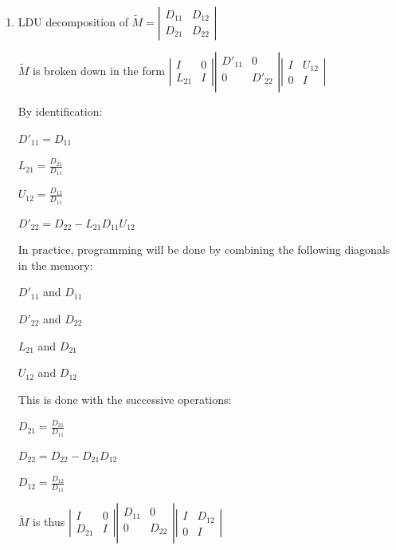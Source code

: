 \begin{enumerate}
  \item LDU decomposition of
$\tilde{M} =
\left|\begin{array}{cc}
  {D_{11} } & {D_{12} } \\
  {D_{21} } & {D_{22} }
\end{array}\right|$

$\widetilde{M}$ is broken down in the form
$\left|
\begin{array}{cc}
  I & 0 \\
  L_{21} & I
\end{array}
\right|
\left|
\begin{array}{cc}
  D'_{11} & 0 \\
  0 & D'_{22} \\
\end{array}
\right|
\left|
\begin{array}{cc}
  I & U_{12} \\
  0 & I
\end{array}
\right|
$

By identification:

$D'_{11} =  D_{11}$

$L_{21} = \frac{D_{21}}{D_{11}}$

$U_{12} = \frac{D_{12}}{D_{11}}$

$D'_{22} =  D_{22} - L_{21}D_{11}U_{12}$

In practice, programming will be done by combining the following diagonals in
the memory:

$D'_{11}$ and $D_{11}$

$D'_{22}$ and $D_{22}$

$L_{21}$ and $D_{21}$

$U_{12}$ and $D_{12}$

This is done with the successive operations:

$D_{21} = \frac{D_{21}}{D_{11}}$

$D_{22} = D_{22} - D_{21}D_{12}$

$D_{12} = \frac{D_{12}}{D_{11}}$

$\widetilde{M}$ is thus
$\left|
\begin{array}{cc}
  I & 0 \\
  D_{21} & I
\end{array}
\right|
\left|
\begin{array}{cc}
  D_{11} & 0 \\
  0 & D_{22} \\
\end{array}
\right|
\left|
\begin{array}{cc}
  I & D_{12} \\
  0 & I
\end{array}
\right|
$


\end{enumerate}
